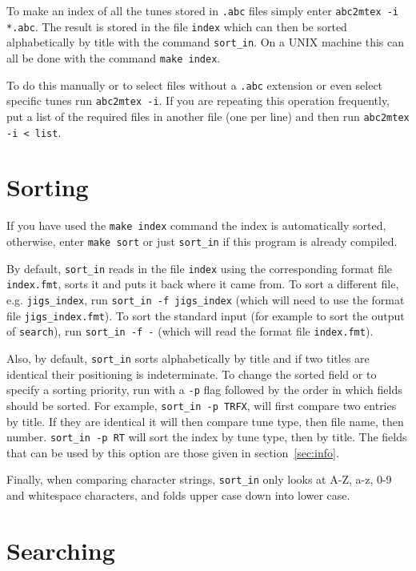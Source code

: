 To make an index of all the tunes stored in {\tt .abc} files simply enter
{\tt abc2mtex -i *.abc}. The result is stored in the file
{\tt index} which can then be sorted alphabetically by title with
the command {\tt sort\_in}. On a UNIX machine this can all be done
with the command {\tt make index}.

To do this manually or to select files without a {\tt .abc} extension or even
select specific tunes run {\tt abc2mtex -i}. If you are repeating
this operation frequently, put a list of the required files in
another file (one per line) and then run {\tt abc2mtex -i < list}.

\section{Sorting}

If you have used the {\tt make index} command the index is
automatically sorted, otherwise, enter
{\tt make sort} or just {\tt sort\_in} if this program is already compiled.

By default, {\tt sort\_in} reads in the file {\tt index} using the
corresponding format file {\tt index.fmt}, sorts it and puts
it back where it came from. To sort a different file, e.g.
{\tt jigs\_index}, run {\tt sort\_in -f jigs\_index} (which will
need to use the format file {\tt jigs\_index.fmt}). To sort the
standard input (for example to sort the output
of {\tt search}), run {\tt sort\_in -f -} (which will read the
format file {\tt index.fmt}).

Also, by default, {\tt sort\_in} sorts alphabetically by title and if
two titles are identical their positioning is indeterminate. To
change the sorted field or to specify a sorting priority, run with
a {\tt -p} flag followed by the order in which fields should be
sorted. For example, {\tt sort\_in -p TRFX}, will first compare
two entries by title. If they are identical it will then compare
tune type, then file name, then number. {\tt sort\_in -p RT} will
sort the index by tune type, then by title. The fields that can be
used by this option are those given in section~\ref{sec:info}.

Finally, when comparing character strings, {\tt sort\_in} only
looks at A-Z, a-z, 0-9 and whitespace characters, and folds
upper case down into lower case.

\section{Searching}

